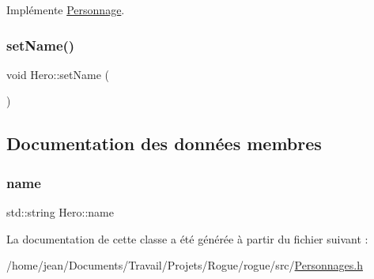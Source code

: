 Implémente \hyperlink{classPersonnage_acdbb926ead0cf6f0b919e72148b02f6d}{Personnage}.

\mbox{\label{classHero_a9759e2cbd4c041ae1aa69c3e6f06b826}} 
\subsubsection{\texorpdfstring{set\+Name()}{setName()}}
{\footnotesize\ttfamily void Hero\+::set\+Name (\begin{DoxyParamCaption}{ }\end{DoxyParamCaption})}



\subsection{Documentation des données membres}
\mbox{\label{classHero_a26989c93944866e4f3b9c60cc8f47e0a}} 
\subsubsection{\texorpdfstring{name}{name}}
{\footnotesize\ttfamily std\+::string Hero\+::name\hspace{0.3cm}{\ttfamily [protected]}}



La documentation de cette classe a été générée à partir du fichier suivant \+:\begin{DoxyCompactItemize}
\item 
/home/jean/\+Documents/\+Travail/\+Projets/\+Rogue/rogue/src/\hyperlink{Personnages_8h}{Personnages.\+h}\end{DoxyCompactItemize}

